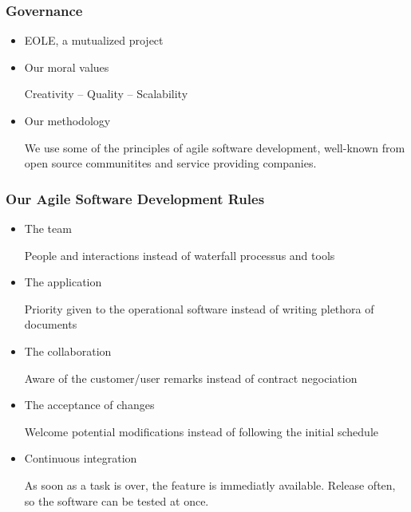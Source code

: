 \documentclass{beamer}
\begin{document}
    \begin{frame}
	    \frametitle{Governance}
	    
    	\begin{itemize}
    		\item \textsc{EOLE}, a mutualized project
		
    		\item Our moral values

    		Creativity -- Quality -- Scalability

    		\item Our methodology

    		We use some of the principles of agile software development, 
    		well-known from open source communitites and service providing 
	    	companies.

    	\end{itemize}
    \end{frame}

    \begin{frame}
    	\frametitle{Our Agile Software Development Rules}

	    \begin{itemize}
	    	\item The team
		
    		People and interactions instead of waterfall processus and tools

    		\item The application

		    Priority given to the operational software instead of writing 
	    	plethora of documents
    
    		\item The collaboration

	    	Aware of the customer/user remarks instead of contract negociation
    
    		\item The acceptance of changes

	    	Welcome potential modifications instead of following the initial
    		schedule

    		\item Continuous integration

		    As soon as a task is over, the feature is immediatly available. 
		    Release often, so the software can be tested at once.
	    \end{itemize}
    \end{frame}
\end{document}
